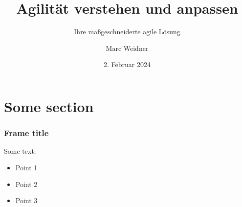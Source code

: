 \documentclass[10pt]{beamer}
\title{Agilität verstehen und anpassen}
\subtitle{Ihre maßgeschneiderte agile Lösung}
\author[M. Weidner]{Marc Weidner}
\date[02.02.2024]{2. Februar 2024}
\begin{document}
\titleframe

\tocframe[hideallsubsections]


\section{Some section}

\begin{frame}
\frametitle{Frame title}
Some text:
\begin{itemize}
\item Point 1
\item Point 2
\item Point 3
\end{itemize}
\end{frame}


\signatureframe
\end{document}
